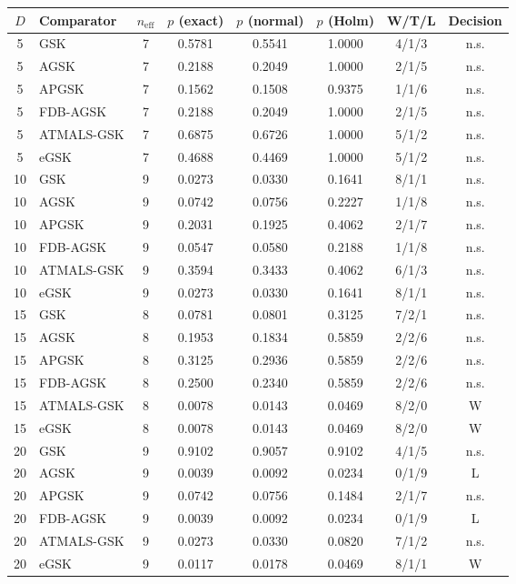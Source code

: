 \documentclass[10pt,a4paper]{article}
\begin{document}
\begin{table}[p]
\zebra
\begin{tabular}{clcccccc}
\toprule
\textbf{$D$} & \textbf{Comparator} & \textbf{$n_{\mathrm{eff}}$} &
\textbf{$p$ (exact)} & \textbf{$p$ (normal)} & \textbf{$p$ (Holm)} &
\textbf{W/T/L} & \textbf{Decision} \\
\midrule
5 & GSK & 7 & 0.5781 & 0.5541 & 1.0000 & 4/1/3 & n.s. \\
5 & AGSK & 7 & 0.2188 & 0.2049 & 1.0000 & 2/1/5 & n.s. \\
5 & APGSK & 7 & 0.1562 & 0.1508 & 0.9375 & 1/1/6 & n.s. \\
5 & FDB-AGSK & 7 & 0.2188 & 0.2049 & 1.0000 & 2/1/5 & n.s. \\
5 & ATMALS-GSK & 7 & 0.6875 & 0.6726 & 1.0000 & 5/1/2 & n.s. \\
5 & eGSK & 7 & 0.4688 & 0.4469 & 1.0000 & 5/1/2 & n.s. \\
\midrule
10 & GSK & 9 & 0.0273 & 0.0330 & 0.1641 & 8/1/1 & n.s. \\
10 & AGSK & 9 & 0.0742 & 0.0756 & 0.2227 & 1/1/8 & n.s. \\
10 & APGSK & 9 & 0.2031 & 0.1925 & 0.4062 & 2/1/7 & n.s. \\
10 & FDB-AGSK & 9 & 0.0547 & 0.0580 & 0.2188 & 1/1/8 & n.s. \\
10 & ATMALS-GSK & 9 & 0.3594 & 0.3433 & 0.4062 & 6/1/3 & n.s. \\
10 & eGSK & 9 & 0.0273 & 0.0330 & 0.1641 & 8/1/1 & n.s. \\
\midrule
15 & GSK & 8 & 0.0781 & 0.0801 & 0.3125 & 7/2/1 & n.s. \\
15 & AGSK & 8 & 0.1953 & 0.1834 & 0.5859 & 2/2/6 & n.s. \\
15 & APGSK & 8 & 0.3125 & 0.2936 & 0.5859 & 2/2/6 & n.s. \\
15 & FDB-AGSK & 8 & 0.2500 & 0.2340 & 0.5859 & 2/2/6 & n.s. \\
15 & ATMALS-GSK & 8 & 0.0078 & 0.0143 & 0.0469 & 8/2/0 & W \\
15 & eGSK & 8 & 0.0078 & 0.0143 & 0.0469 & 8/2/0 & W \\
\midrule
20 & GSK & 9 & 0.9102 & 0.9057 & 0.9102 & 4/1/5 & n.s. \\
20 & AGSK & 9 & 0.0039 & 0.0092 & 0.0234 & 0/1/9 & L \\
20 & APGSK & 9 & 0.0742 & 0.0756 & 0.1484 & 2/1/7 & n.s. \\
20 & FDB-AGSK & 9 & 0.0039 & 0.0092 & 0.0234 & 0/1/9 & L \\
20 & ATMALS-GSK & 9 & 0.0273 & 0.0330 & 0.0820 & 7/1/2 & n.s. \\
20 & eGSK & 9 & 0.0117 & 0.0178 & 0.0469 & 8/1/1 & W \\
\bottomrule
\end{tabular}
\end{table}
\end{document}
